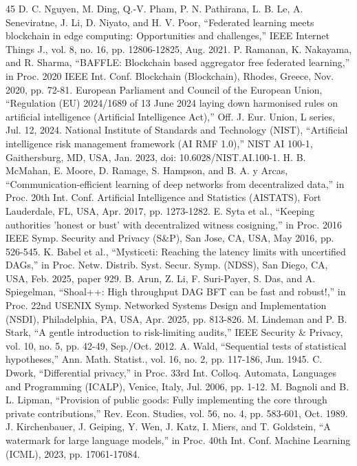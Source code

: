 \documentclass[conference]{IEEEtran}
\begin{document}
\begin{thebibliography}{45}
 D. C. Nguyen, M. Ding, Q.-V. Pham, P. N. Pathirana, L. B. Le, A. Seneviratne, J. Li, D. Niyato, and H. V. Poor, ``Federated learning meets blockchain in edge computing: Opportunities and challenges,'' IEEE Internet Things J., vol. 8, no. 16, pp. 12806-12825, Aug. 2021.
 P. Ramanan, K. Nakayama, and R. Sharma, ``BAFFLE: Blockchain based aggregator free federated learning,'' in Proc. 2020 IEEE Int. Conf. Blockchain (Blockchain), Rhodes, Greece, Nov. 2020, pp. 72-81.
 European Parliament and Council of the European Union, ``Regulation (EU) 2024/1689 of 13 June 2024 laying down harmonised rules on artificial intelligence (Artificial Intelligence Act),'' Off. J. Eur. Union, L series, Jul. 12, 2024.
 National Institute of Standards and Technology (NIST), ``Artificial intelligence risk management framework (AI RMF 1.0),'' NIST AI 100-1, Gaithersburg, MD, USA, Jan. 2023, doi: 10.6028/NIST.AI.100-1.
 H. B. McMahan, E. Moore, D. Ramage, S. Hampson, and B. A. y Arcas, ``Communication-efficient learning of deep networks from decentralized data,'' in Proc. 20th Int. Conf. Artificial Intelligence and Statistics (AISTATS), Fort Lauderdale, FL, USA, Apr. 2017, pp. 1273-1282.
 E. Syta et al., ``Keeping authorities 'honest or bust' with decentralized witness cosigning,'' in Proc. 2016 IEEE Symp. Security and Privacy (S\&P), San Jose, CA, USA, May 2016, pp. 526-545.
 K. Babel et al., ``Mysticeti: Reaching the latency limits with uncertified DAGs,'' in Proc. Netw. Distrib. Syst. Secur. Symp. (NDSS), San Diego, CA, USA, Feb. 2025, paper 929.
 B. Arun, Z. Li, F. Suri-Payer, S. Das, and A. Spiegelman, ``Shoal++: High throughput DAG BFT can be fast and robust!,'' in Proc. 22nd USENIX Symp. Networked Systems Design and Implementation (NSDI), Philadelphia, PA, USA, Apr. 2025, pp. 813-826.
 M. Lindeman and P. B. Stark, ``A gentle introduction to risk-limiting audits,'' IEEE Security \& Privacy, vol. 10, no. 5, pp. 42-49, Sep./Oct. 2012.
 A. Wald, ``Sequential tests of statistical hypotheses,'' Ann. Math. Statist., vol. 16, no. 2, pp. 117-186, Jun. 1945.
 C. Dwork, ``Differential privacy,'' in Proc. 33rd Int. Colloq. Automata, Languages and Programming (ICALP), Venice, Italy, Jul. 2006, pp. 1-12.
 M. Bagnoli and B. L. Lipman, ``Provision of public goods: Fully implementing the core through private contributions,'' Rev. Econ. Studies, vol. 56, no. 4, pp. 583-601, Oct. 1989.
 J. Kirchenbauer, J. Geiping, Y. Wen, J. Katz, I. Miers, and T. Goldstein, ``A watermark for large language models,'' in Proc. 40th Int. Conf. Machine Learning (ICML), 2023, pp. 17061-17084.

\end{thebibliography}
\end{document}
